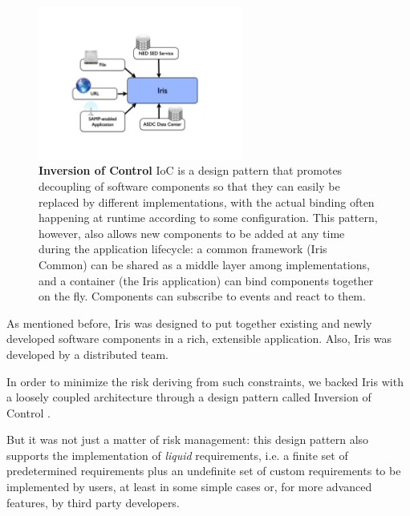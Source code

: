 \documentclass[final,5p]{elsarticle}
\begin{document}
\begin{figure}
\begin{center}
\includegraphics[width=0.6\textwidth]{figures/IrisDiagrams.002.png}
\caption{\textbf{Inversion of Control} IoC is a design pattern that promotes decoupling of software components so that they can easily be replaced by different implementations, with the actual binding often happening at runtime according to some configuration. This pattern, however, also allows new components to be added at any time during the application lifecycle: a common framework (Iris Common) can be shared as a middle layer among implementations, and a container (the Iris application) can bind components together on the fly. Components can subscribe to events and react to them.}
\label{fig:ioc}
\end{center}
\end{figure}

As mentioned before, Iris was designed to put together existing and newly developed software components in a rich, extensible application. Also, Iris was developed by a distributed team.

In order to minimize the risk deriving from such constraints, we backed Iris with a loosely coupled architecture through a design pattern called Inversion of Control \citep*{ioc}.

But it was not just a matter of risk management: this design pattern also supports the implementation of \emph{liquid} requirements, i.e. a finite set of predetermined requirements plus an undefinite set of custom requirements to be implemented by users, at least in some simple cases or, for more advanced features, by third party developers.
\end{document}
